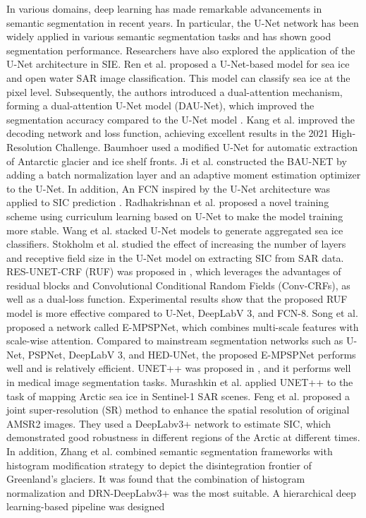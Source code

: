 In various domains, deep learning has made remarkable advancements in semantic segmentation in recent years. In particular, the U-Net network has been widely applied in various semantic segmentation tasks and has shown good segmentation performance. Researchers have also explored the application of the U-Net architecture in SIE. Ren et al. \cite{122ren2020sea} proposed a U-Net-based model for sea ice and open water SAR image classification. This model can classify sea ice at the pixel level. Subsequently, the authors introduced a dual-attention mechanism, forming a dual-attention U-Net model (DAU-Net), which improved the segmentation accuracy compared to the U-Net model \cite{123ren2021development,124ren2023sea}. Kang et al. \cite{121kang2022decoding} improved the decoding network and loss function, achieving excellent results in the 2021 High-Resolution Challenge. Baumhoer \cite{92baumhoer2019automated} used a modified U-Net for automatic extraction of Antarctic glacier and ice shelf fronts. Ji et al. \cite{148ji2022semantic} constructed the BAU-NET by adding a batch normalization layer and an adaptive moment estimation optimizer to the U-Net. In addition, An FCN inspired by the U-Net architecture was applied to SIC prediction \cite{112de2021prediction}. Radhakrishnan et al. \cite{94radhakrishnan2021sea} proposed a novel training scheme using curriculum learning based on U-Net to make the model training more stable. Wang et al. \cite{95wang2021arctic} stacked U-Net models to generate aggregated sea ice classifiers. Stokholm et al. \cite{96stokholm2022ai4seaice} studied the effect of increasing the number of layers and receptive field size in the U-Net model on extracting SIC from SAR data. RES-UNET-CRF (RUF) was proposed in \cite{101nagi2021ruf}, which leverages the advantages of residual blocks and Convolutional Conditional Random Fields (Conv-CRFs), as well as a dual-loss function. Experimental results show that the proposed RUF model is more effective compared to U-Net, DeepLabV 3, and FCN-8. Song et al. \cite{117song2022mpspnet} proposed a network called E-MPSPNet, which combines multi-scale features with scale-wise attention. Compared to mainstream segmentation networks such as U-Net, PSPNet, DeepLabV 3, and HED-UNet, the proposed E-MPSPNet performs well and is relatively efficient. UNET++ was proposed in \cite{119zhou2018unet++}, and it performs well in medical image segmentation tasks. Murashkin et al. \cite{120murashkin2021arctic} applied UNET++ to the task of mapping Arctic sea ice in Sentinel-1 SAR scenes. Feng et al. \cite{128feng2022super} proposed a joint super-resolution (SR) method to enhance the spatial resolution of original AMSR2 images. They used a DeepLabv3+ network to estimate SIC, which demonstrated good robustness in different regions of the Arctic at different times. In addition, Zhang et al. \cite{90zhang2021automated} combined semantic segmentation frameworks with histogram modification strategy to depict the disintegration frontier of Greenland's glaciers. It was found that the combination of histogram normalization and DRN-DeepLabv3+ was the most suitable. A hierarchical deep learning-based pipeline was designed 